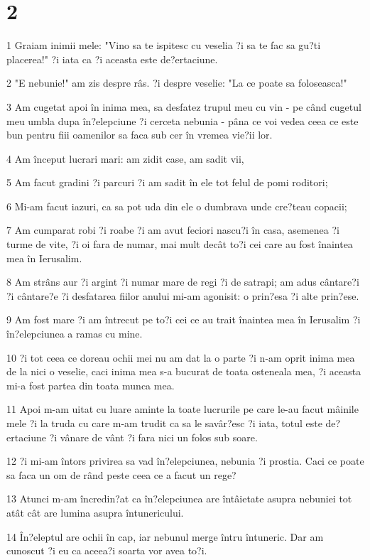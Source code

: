 \chapter{2}

\par 1 Graiam inimii mele: "Vino sa te ispitesc cu veselia ?i sa te fac sa gu?ti placerea!" ?i iata ca ?i aceasta este de?ertaciune.
\par 2 "E nebunie!" am zis despre râs. ?i despre veselie: "La ce poate sa foloseasca!"
\par 3 Am cugetat apoi în inima mea, sa desfatez trupul meu cu vin - pe când cugetul meu umbla dupa în?elepciune ?i cerceta nebunia - pâna ce voi vedea ceea ce este bun pentru fiii oamenilor sa faca sub cer în vremea vie?ii lor.
\par 4 Am început lucrari mari: am zidit case, am sadit vii,
\par 5 Am facut gradini ?i parcuri ?i am sadit în ele tot felul de pomi roditori;
\par 6 Mi-am facut iazuri, ca sa pot uda din ele o dumbrava unde cre?teau copacii;
\par 7 Am cumparat robi ?i roabe ?i am avut feciori nascu?i în casa, asemenea ?i turme de vite, ?i oi fara de numar, mai mult decât to?i cei care au fost înaintea mea în Ierusalim.
\par 8 Am strâns aur ?i argint ?i numar mare de regi ?i de satrapi; am adus cântare?i ?i cântare?e ?i desfatarea fiilor anului mi-am agonisit: o prin?esa ?i alte prin?ese.
\par 9 Am fost mare ?i am întrecut pe to?i cei ce au trait înaintea mea în Ierusalim ?i în?elepciunea a ramas cu mine.
\par 10 ?i tot ceea ce doreau ochii mei nu am dat la o parte ?i n-am oprit inima mea de la nici o veselie, caci inima mea s-a bucurat de toata osteneala mea, ?i aceasta mi-a fost partea din toata munca mea.
\par 11 Apoi m-am uitat cu luare aminte la toate lucrurile pe care le-au facut mâinile mele ?i la truda cu care m-am trudit ca sa le savâr?esc ?i iata, totul este de?ertaciune ?i vânare de vânt ?i fara nici un folos sub soare.
\par 12 ?i mi-am întors privirea sa vad în?elepciunea, nebunia ?i prostia. Caci ce poate sa faca un om de rând peste ceea ce a facut un rege?
\par 13 Atunci m-am încredin?at ca în?elepciunea are întâietate asupra nebuniei tot atât cât are lumina asupra întunericului.
\par 14 În?eleptul are ochii în cap, iar nebunul merge întru întuneric. Dar am cunoscut ?i eu ca aceea?i soarta vor avea to?i.
